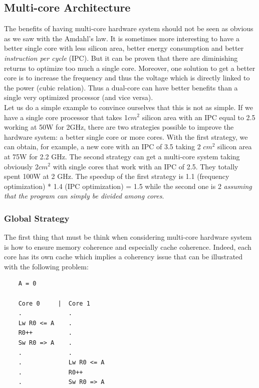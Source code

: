 \documentclass[10pt,letterpaper]{article}
\begin{document}
\subsection{Multi-core Architecture}

The benefits of having multi-core hardware system should not be seen as obvious as we saw with the Amdahl's law. It is sometimes more interesting to have a better single core with less silicon area, better energy consumption and better \textit{instruction per cycle} (IPC). But it can be proven that there are diminishing returns to optimize too much a single core. Moreover, one solution to get a better core is to increase the frequency and thus the voltage which is directly linked to the power (cubic relation). Thus a dual-core can have better benefits than a single very optimized processor (and vice versa).\\

Let us do a simple example to convince ourselves that this is not as simple. If we have a single core processor that takes 1$cm^2$ silicon area with an IPC equal to 2.5 working at 50W for 2GHz, there are two strategies possible to improve the hardware system: a better single core or more cores. With the first strategy, we can obtain, for example, a new core with an IPC of 3.5 taking 2 $cm^2$ silicon area at 75W for 2.2 GHz. The second strategy can get a multi-core system taking obviously 2$cm^2$ with single cores that work with an IPC of 2.5. They totally spent 100W at 2 GHz. The speedup of the first strategy is 1.1 (frequency optimization) * 1.4 (IPC optimization) = 1.5 while the second one is 2 \textit{assuming that the program can simply be divided among cores}. 

\newpage

\subsubsection{Global Strategy}

The first thing that must be think when considering multi-core hardware system is how to ensure memory coherence and especially cache coherence. Indeed, each core has its own cache which implies a coherency issue that can be illustrated with the following problem:

\begin{verbatim}
    A = 0
    
    Core 0     |  Core 1
    .             .
    Lw R0 <= A    .
    R0++          .
    Sw R0 => A    .
    .             .
    .             Lw R0 <= A
    .             R0++
    .             Sw R0 => A
\end{verbatim}
\end{document}
